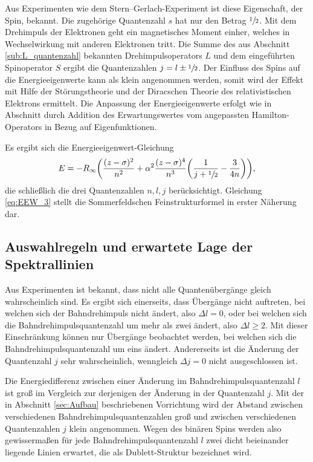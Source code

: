 Aus Experimenten wie dem Stern--Gerlach-Experiment ist diese Eigenschaft, der Spin, bekannt.
Die zugehörige Quantenzahl $s$ hat nur den Betrag $\sfrac{1}{2}$.
Mit dem Drehimpuls der Elektronen geht ein magnetisches Moment einher, welches in Wechselwirkung mit anderen Elektronen tritt.
Die Summe des aus Abschnitt \ref{sub:L_quantenzahl} bekannten Drehimpulsoperators $L$ und dem eingeführten Spinoperator $S$ ergibt die Quantenzahlen
$j=l\pm\sfrac{1}{2}$.
Der Einfluss des Spins auf die Energieeigenwerte kann als klein angenommen werden, somit wird der Effekt mit Hilfe der Störungstheorie und der Diracschen Theorie des relativistischen Elektrons ermittelt.
Die Anpassung der Energieeigenwerte erfolgt wie in Abschnitt \label{sub:rel} durch Addition des Erwartungswertes vom angepassten Hamilton-Operators in Bezug auf Eigenfunktionen.

Es ergibt sich die Energieeigenwert-Gleichung
\begin{equation}
	E=-R_\infty\biggl(\frac{(z-\sigma)^2}{n^2}+\alpha^2\frac{(z-\sigma)^4}{n^3}\biggl(\frac{1}{j+\sfrac{1}{2}}-\frac{3}{4n}\biggr) \biggr),
	\label{eq:EEW_3}
\end{equation}
die schließlich die drei Quantenzahlen $n,l,j$ berücksichtigt.
Gleichung \eqref{eq:EEW_3} stellt die Sommerfeldschen Feinstrukturformel in erster Näherung dar.

\subsection{Auswahlregeln und erwartete Lage der Spektrallinien}
Aus Experimenten ist bekannt, dass nicht alle Quantenübergänge gleich wahrscheinlich sind.
Es ergibt sich einerseits, dass Übergänge nicht auftreten, bei welchen sich der Bahndrehimpuls nicht ändert, also $\Delta l=0$, oder bei welchen sich die Bahndrehimpulsquantenzahl um mehr als zwei ändert, also $\Delta l\ge2$.
Mit dieser Einschränkung können nur Übergänge beobachtet werden, bei welchen sich die Bahndrehimpulsquantenzahl um eins ändert.
Andererseits ist die Änderung der Quantenzahl $j$ sehr wahrscheinlich, wenngleich $\Delta j=0$ nicht ausgeschlossen ist.

Die Energiedifferenz zwischen einer Änderung im Bahndrehimpulsquantenzahl $l$ ist groß im Vergleich zur derjenigen der Änderung in der Quantenzahl $j$.
Mit der in Abschnitt \ref{sec:Aufbau} beschriebenen Vorrichtung wird der Abstand zwischen verschiedenen Bahndrehimpulsquantenzahlen groß und zwischen verschiedenen Quantenzahlen $j$ klein angenommen.
Wegen des binären Spins werden also gewissermaßen für jede Bahndrehimpulsquantenzahl $l$ zwei dicht beieinander liegende Linien erwartet, die als Dublett-Struktur bezeichnet wird.

